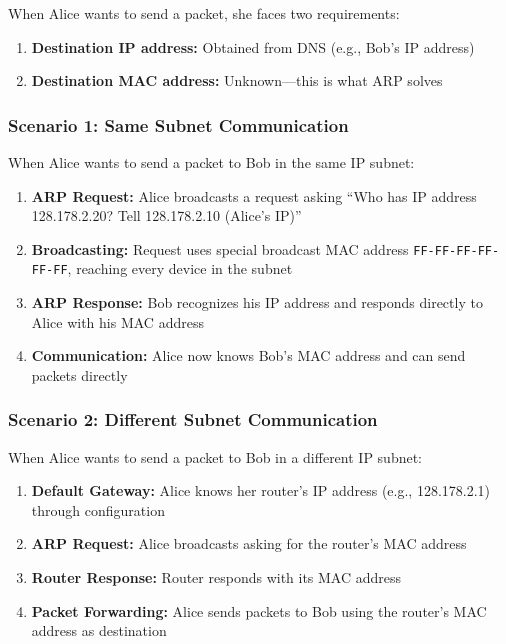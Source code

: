 \documentclass[../../compsys.tex]{subfiles}
\begin{document}
When Alice wants to send a packet, she faces two requirements:
\begin{enumerate}
    \item \textbf{Destination IP address:} Obtained from DNS (e.g., Bob's IP address)
    \item \textbf{Destination MAC address:} Unknown---this is what ARP solves
\end{enumerate}

\subsubsection{Scenario 1: Same Subnet Communication}

When Alice wants to send a packet to Bob in the same IP subnet:

\begin{enumerate}
    \item \textbf{ARP Request:} Alice broadcasts a request asking ``Who has IP address 128.178.2.20? Tell 128.178.2.10 (Alice's IP)''
    \item \textbf{Broadcasting:} Request uses special broadcast MAC address \texttt{FF-FF-FF-FF-FF-FF}, reaching every device in the subnet
    \item \textbf{ARP Response:} Bob recognizes his IP address and responds directly to Alice with his MAC address
    \item \textbf{Communication:} Alice now knows Bob's MAC address and can send packets directly
\end{enumerate}

\subsubsection{Scenario 2: Different Subnet Communication}

When Alice wants to send a packet to Bob in a different IP subnet:

\begin{enumerate}
    \item \textbf{Default Gateway:} Alice knows her router's IP address (e.g., 128.178.2.1) through configuration
    \item \textbf{ARP Request:} Alice broadcasts asking for the router's MAC address
    \item \textbf{Router Response:} Router responds with its MAC address
    \item \textbf{Packet Forwarding:} Alice sends packets to Bob using the router's MAC address as destination
\end{enumerate}
\end{document}
